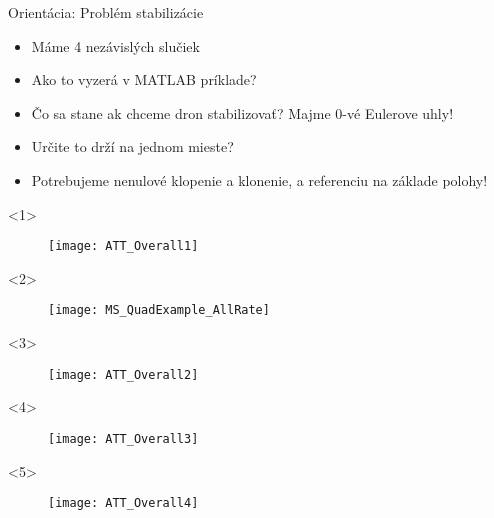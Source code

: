 \begin{frame}[t]{Orientácia: Problém stabilizácie}\
\begin{itemize}
  \item<1-> Máme 4 nezávislých slučiek
  \item<2-> Ako to vyzerá v MATLAB príklade?
  \item<3-> Čo sa stane ak chceme dron stabilizovať? Majme 0-vé Eulerove uhly!
  \item<4-> Určite to drží na jednom mieste?
  \item<5-> Potrebujeme nenulové klopenie a klonenie, a referenciu na základe polohy!
\end{itemize}
  \begin{onlyenv}<1>
\begin{figure}
\centering
  \texttt{[image: ATT\_Overall1]}\\
\end{figure}
  \end{onlyenv}

    \begin{onlyenv}<2>
\begin{figure}
\centering
  \texttt{[image: MS\_QuadExample\_AllRate]}\\
\end{figure}
  \end{onlyenv}


    \begin{onlyenv}<3>
\begin{figure}
\centering
  \texttt{[image: ATT\_Overall2]}\\
\end{figure}
  \end{onlyenv}
      \begin{onlyenv}<4>
\begin{figure}
\centering
  \texttt{[image: ATT\_Overall3]}\\
\end{figure}
  \end{onlyenv}
        \begin{onlyenv}<5>
\begin{figure}
\centering
  \texttt{[image: ATT\_Overall4]}\\
\end{figure}
  \end{onlyenv}

\end{frame}
